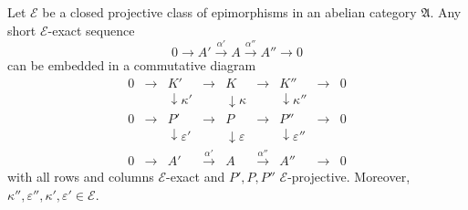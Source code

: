Let $\mathcal{E}$ be a closed projective class of epimorphisms in an abelian category $\mathfrak{A}$. Any short $\mathcal{E}$-exact sequence
\[
0 \to A' \xrightarrow{\alpha'} A \xrightarrow{\alpha''} A'' \to 0
\]
can be embedded in a commutative diagram
\[
\begin{array}{ccccccccc}
0 & \to & K' & \to & K & \to & K'' & \to & 0 \\
& & \downarrow\kappa' & & \downarrow\kappa & & \downarrow\kappa'' & & \\
0 & \to & P' & \to & P & \to & P'' & \to & 0 \\
& & \downarrow\varepsilon' & & \downarrow\varepsilon & & \downarrow\varepsilon'' & & \\
0 & \to & A' & \xrightarrow{\alpha'} & A & \xrightarrow{\alpha''} & A'' & \to & 0
\end{array}
\]
with all rows and columns $\mathcal{E}$-exact and $P', P, P''$ $\mathcal{E}$-projective. Moreover, $\kappa'', \varepsilon'', \kappa', \varepsilon' \in \mathcal{E}$.
